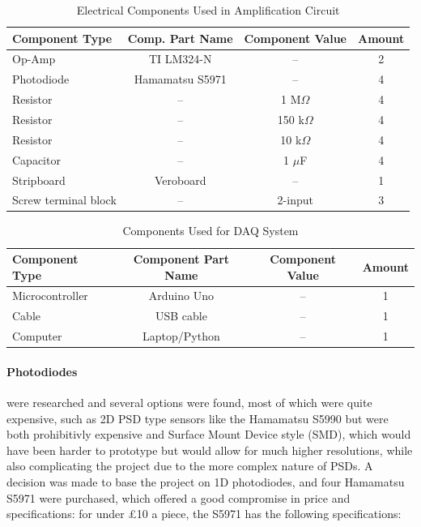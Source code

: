 \begin{table}[htbp]
  \centering
  \begin{threeparttable}
    \caption{Electrical Components Used in Amplification Circuit}
    \label{tab:components_list_stripboard}
    \begin{tabular}{lccc}  
      \toprule
      \textbf{Component Type} & \textbf{Comp. Part Name} & \textbf{Component Value} & \textbf{Amount} \\
      \midrule
      Op-Amp & TI LM324-N & -- & 2 \\
      Photodiode & Hamamatsu S5971 & -- & 4 \\
      Resistor & -- & 1 M$\Omega$ & 4 \\
      Resistor & -- & 150 k$\Omega$ & 4 \\
      Resistor & -- & 10 k$\Omega$ & 4 \\
      Capacitor & -- & 1 $\mu$F & 4 \\
      Stripboard & Veroboard & -- & 1 \\
      Screw terminal block & -- & 2-input & 3 \\
      \bottomrule
    \end{tabular}
    
  \end{threeparttable}
\end{table}

\begin{table}[htbp]
  \centering
  \begin{threeparttable}
    \caption{Components Used for DAQ System}
    \label{tab:daq_components}
    
    \begin{tabular}{lccc}  
      \toprule
      \textbf{Component Type} & \textbf{Component Part Name} & \textbf{Component Value} & \textbf{Amount} \\
      \midrule
      Microcontroller & Arduino Uno & -- & 1 \\
      Cable & USB cable & -- & 1 \\
      Computer & Laptop/Python & -- & 1 \\
      \bottomrule
    \end{tabular}
    
  \end{threeparttable}
\end{table}

\paragraph{Photodiodes} were researched and several options were found, most of which were quite expensive, such as 2D PSD type sensors like the Hamamatsu S5990 but were both prohibitivly expensive and Surface Mount Device style (SMD), which would have been harder to prototype but would allow for much higher resolutions, while also complicating the project due to the more complex nature of PSDs. A decision was made to base the project on 1D photodiodes, and four Hamamatsu S5971 were purchased, which offered a good compromise in price and specifications: for under £10 a piece, the S5971 has the following specifications:

